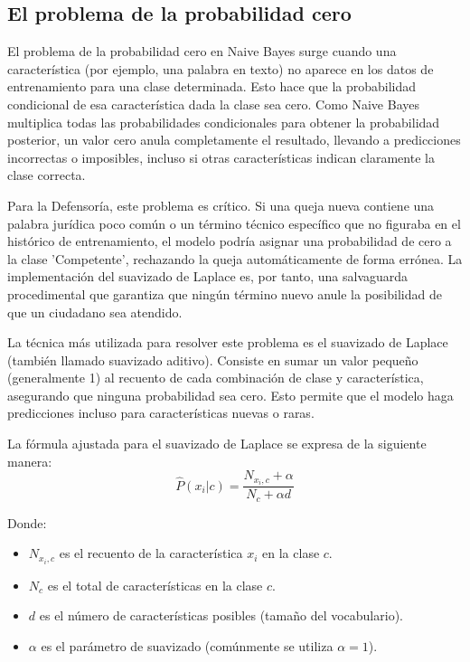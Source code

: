 \subsection{El problema de la probabilidad cero}


El problema de la probabilidad cero en Naive Bayes surge cuando una característica (por ejemplo, una palabra en texto) no aparece en los datos de entrenamiento para una clase determinada. Esto hace que la probabilidad condicional de esa característica dada la clase sea cero. Como Naive Bayes multiplica todas las probabilidades condicionales para obtener la probabilidad posterior, un valor cero anula completamente el resultado, llevando a predicciones incorrectas o imposibles, incluso si otras características indican claramente la clase correcta.

Para la Defensoría, este problema es crítico. Si una queja nueva contiene una palabra jurídica poco común o un término técnico específico que no figuraba en el histórico de entrenamiento, el modelo podría asignar una probabilidad de cero a la clase 'Competente', rechazando la queja automáticamente de forma errónea. La implementación del suavizado de Laplace es, por tanto, una salvaguarda procedimental que garantiza que ningún término nuevo anule la posibilidad de que un ciudadano sea atendido.

La técnica más utilizada para resolver este problema es el suavizado de Laplace (también llamado suavizado aditivo).  Consiste en sumar un valor pequeño (generalmente 1) al recuento de cada combinación de clase y característica, asegurando que ninguna probabilidad sea cero. Esto permite que el modelo haga predicciones incluso para características nuevas o raras.

La fórmula ajustada para el suavizado de Laplace se expresa de la siguiente manera:
\begin{equation}
\hat{P}(x_i | c) = \frac{N_{x_i,c} + \alpha}{N_c + \alpha d}
\end{equation}

Donde:
\begin{itemize}
    \item $N_{x_i,c}$ es el recuento de la característica $x_i$ en la clase $c$.
    \item $N_c$ es el total de características en la clase $c$.
    \item $d$ es el número de características posibles (tamaño del vocabulario).
    \item $\alpha$ es el parámetro de suavizado (comúnmente se utiliza $\alpha = 1$).
\end{itemize}

